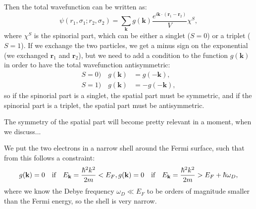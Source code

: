 Then the total wavefunction can be written as:
\[
    \psi(r_1, \sigma_1 ; r_2, \sigma_2) = \sum_{\mathbf{k}} g(\mathbf{k}) \frac{e^{i \mathbf{k} \cdot (\mathbf{r}_1 - \mathbf{r}_2) }}{V} \chi^S,
\]
where \(\chi^S\) is the spinorial part, which can be either a singlet (\(S=0\)) or a triplet (\(S=1\)). If we exchange the two particles, we get a minus sign on the exponential (we exchanged \(\mathbf{r}_1\) and \(\mathbf{r}_2\)), but we need to add a condition to the function \(g(\mathbf{k})\) in order to have the total wavefunction antisymmetric:
\[
    \begin{aligned}
        S=0) \quad g(\mathbf{k}) & = g(-\mathbf{k}),  \\
        S=1) \quad g(\mathbf{k}) & = -g(-\mathbf{k}),
    \end{aligned}
\]
so if the spinorial part is a singlet, the spatial part must be symmetric, and if the spinorial part is a triplet, the spatial part must be antisymmetric.

The symmetry of the spatial part will become pretty relevant in a moment, when we discuss...

We put the two electrons in a narrow shell around the Fermi surface, such that from this follows a constraint:
\[
    g(\mathbf{k}) = 0 \quad \text{if} \quad E_{\mathbf{k}} = \frac{\hbar^2 k^2}{2m} < E_F , \\
    g(\mathbf{k}) = 0 \quad \text{if} \quad E_{\mathbf{k}} = \frac{\hbar^2 k^2}{2m} > E_F + \hbar \omega_D,
\]
where we know the Debye frequency \(\omega_D \ll E_F\) to be orders of magnitude smaller than the Fermi energy, so the shell is very narrow.

